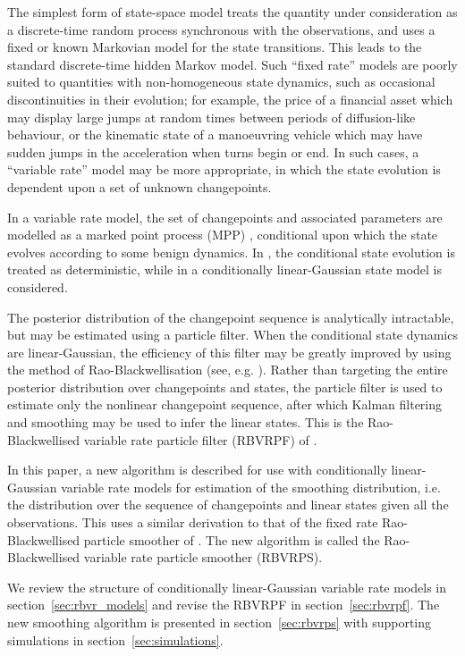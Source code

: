 \documentclass[journal]{IEEEtran}
\begin{document}
The simplest form of state-space model treats the quantity under consideration as a discrete-time random process synchronous with the observations, and uses a fixed or known Markovian model for the state transitions. This leads to the standard discrete-time hidden Markov model. Such ``fixed rate'' models are poorly suited to quantities with non-homogeneous state dynamics, such as occasional discontinuities in their evolution; for example, the price of a financial asset which may display large jumps at random times between periods of diffusion-like behaviour, or the kinematic state of a manoeuvring vehicle which may have sudden jumps in the acceleration when turns begin or end. In such cases, a ``variable rate'' model may be more appropriate, in which the state evolution is dependent upon a set of unknown changepoints.

In a variable rate model, the set of changepoints and associated parameters are modelled as a marked point process (MPP) \cite{Jacobsen2006}, conditional upon which the state evolves according to some benign dynamics. In \cite{Godsill2007,Whiteley2011}, the conditional state evolution is treated as deterministic, while in \cite{Godsill2007a,Christensen2012} a conditionally linear-Gaussian state model is considered.

The posterior distribution of the changepoint sequence is analytically intractable, but may be estimated using a particle filter. When the conditional state dynamics are linear-Gaussian, the efficiency of this filter may be greatly improved by using the method of Rao-Blackwellisation (see, e.g. \cite{Casella1996,Doucet2000}). Rather than targeting the entire posterior distribution over changepoints and states, the particle filter is used to estimate only the nonlinear changepoint sequence, after which Kalman filtering and smoothing may be used to infer the linear states. This is the Rao-Blackwellised variable rate particle filter (RBVRPF) of \cite{Godsill2007a,Christensen2012}.

In this paper, a new algorithm is described for use with conditionally linear-Gaussian variable rate models for estimation of the smoothing distribution, i.e. the distribution over the sequence of changepoints and linear states given all the observations. This uses a similar derivation to that of the fixed rate Rao-Blackwellised particle smoother of \cite{Sarkka2012}. The new algorithm is called the Rao-Blackwellised variable rate particle smoother (RBVRPS).

We review the structure of conditionally linear-Gaussian variable rate models in section~\ref{sec:rbvr_models} and revise the RBVRPF in section~\ref{sec:rbvrpf}. The new smoothing algorithm is presented in section~\ref{sec:rbvrps} with supporting simulations in section~\ref{sec:simulations}.
\end{document}
